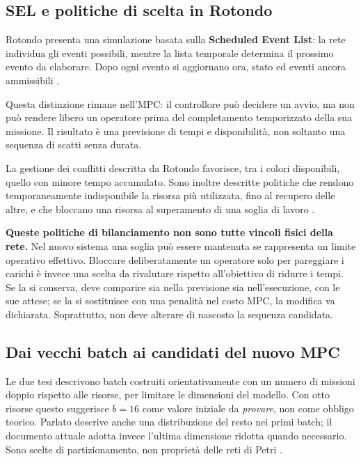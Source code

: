 \subsection{SEL e politiche di scelta in Rotondo}

Rotondo presenta una simulazione basata sulla \textbf{Scheduled Event List}: la rete individua gli eventi possibili, mentre la lista temporale determina il prossimo evento da elaborare. Dopo ogni evento si aggiornano ora, stato ed eventi ancora ammissibili \cite[sezione 2.3, pp. 10--11]{Rotondo}.

Questa distinzione rimane nell'MPC: il controllore può decidere un avvio, ma non può rendere libero un operatore prima del completamento temporizzato della sua missione. Il risultato è una previsione di tempi e disponibilità, non soltanto una sequenza di scatti senza durata.

La gestione dei conflitti descritta da Rotondo favorisce, tra i colori disponibili, quello con minore tempo accumulato. Sono inoltre descritte politiche che rendono temporaneamente indisponibile la risorsa più utilizzata, fino al recupero delle altre, e che bloccano una risorsa al superamento di una soglia di lavoro \cite[sezioni 2.6.2--2.6.3, pp. 16--20]{Rotondo}.

\textbf{Queste politiche di bilanciamento non sono tutte vincoli fisici della rete.} Nel nuovo sistema una soglia può essere mantenuta se rappresenta un limite operativo effettivo. Bloccare deliberatamente un operatore solo per pareggiare i carichi è invece una scelta da rivalutare rispetto all'obiettivo di ridurre i tempi. Se la si conserva, deve comparire sia nella previsione sia nell'esecuzione, con le sue attese; se la si sostituisce con una penalità nel costo MPC, la modifica va dichiarata. Soprattutto, non deve alterare di nascosto la sequenza candidata.

\subsection{Dai vecchi batch ai candidati del nuovo MPC}

Le due tesi descrivono batch costruiti orientativamente con un numero di missioni doppio rispetto alle risorse, per limitare le dimensioni del modello. Con otto risorse questo suggerisce $b=16$ come valore iniziale da \emph{provare}, non come obbligo teorico. Parlato descrive anche una distribuzione del resto nei primi batch; il documento attuale adotta invece l'ultima dimensione ridotta quando necessario. Sono scelte di partizionamento, non proprietà delle reti di Petri \cite[sezione 2.3.1]{Parlato}\cite[sezione 2.6.3]{Rotondo}.

